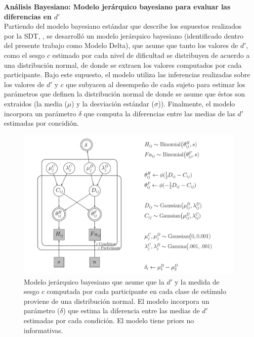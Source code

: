 \textbf{Análisis Bayesiano: Modelo jerárquico bayesiano para evaluar las diferencias en $d'$}\\

Partiendo del modelo bayesiano estándar que describe los supuestos realizados por la SDT, \parencite{LeeBook}, se desarrolló un modelo jerárquico bayesiano (identificado dentro del presente trabajo como Modelo Delta), que asume que tanto los valores de $d'$, como el sesgo $c$ estimado por cada nivel de dificultad se distribuyen de acuerdo a una distribución normal, de donde se extraen los valores computados por cada participante. Bajo este supuesto, el modelo utiliza las inferencias realizadas sobre los valores de $d'$ y $c$ que subyacen al desempeño de cada sujeto para estimar los parámetros que definen la distribución normal de donde se asume que éstos son extraidos (la media ($\mu$) y la desviación estándar ($\sigma$)). Finalmente, el modelo incorpora un parámetro $\delta$ que computa la diferencias entre las medias de las $d'$ estimadas por concidión.\\

\begin{figure}[th]
\centering
\includegraphics[width=1.1\textwidth]{Figures/Model_Delta_Diff_D}
\caption[Modelo Delta: Modelo jerárquico bayesiano para revisar las diferencias en $d'$ entre clases de estímulos]{Modelo jerárquico bayesiano que asume que la $d'$ y la medida de sesgo $c$ computada por cada participante en cada clase de estímulo proviene de una distribución normal. El modelo incorpora un parámetro ($\delta$) que estima la diferencia entre las medias de $d'$ estimadas por cada condición. El modelo tiene priors no informativas.}
\label{fig:Mod_Delta}
\end{figure}

